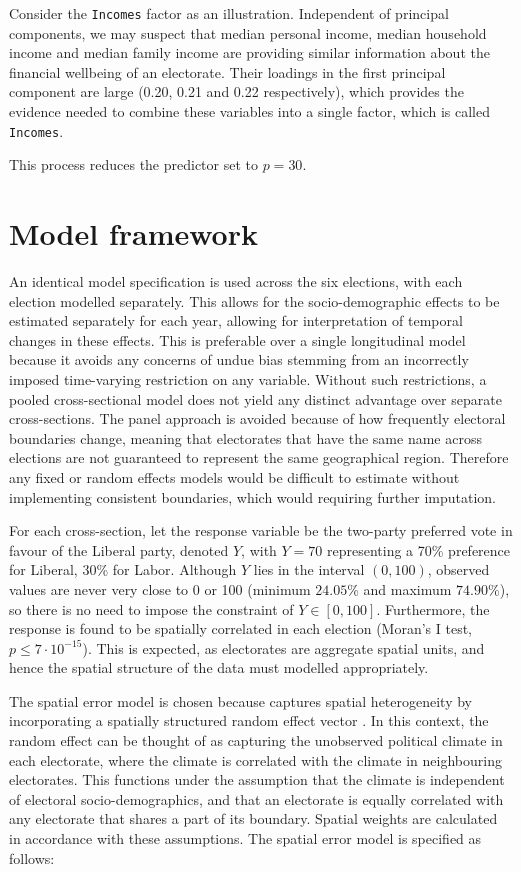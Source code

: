\documentclass[openany]{book}
\begin{document}
Consider the \texttt{Incomes} factor as an illustration. Independent of principal components, we may suspect that median personal income, median household income and median family income are providing similar information about the financial wellbeing of an electorate. Their loadings in the first principal component are large (0.20, 0.21 and 0.22 respectively), which provides the evidence needed to combine these variables into a single factor, which is called \texttt{Incomes}.

This process reduces the predictor set to \(p = 30\).

\hypertarget{model-framework}{%
\section{Model framework}\label{model-framework}}

An identical model specification is used across the six elections, with each election modelled separately. This allows for the socio-demographic effects to be estimated separately for each year, allowing for interpretation of temporal changes in these effects. This is preferable over a single longitudinal model because it avoids any concerns of undue bias stemming from an incorrectly imposed time-varying restriction on any variable. Without such restrictions, a pooled cross-sectional model does not yield any distinct advantage over separate cross-sections. The panel approach is avoided because of how frequently electoral boundaries change, meaning that electorates that have the same name across elections are not guaranteed to represent the same geographical region. Therefore any fixed or random effects models would be difficult to estimate without implementing consistent boundaries, which would requiring further imputation.

For each cross-section, let the response variable be the two-party preferred vote in favour of the Liberal party, denoted \(Y\), with \(Y = 70\) representing a 70\% preference for Liberal, 30\% for Labor. Although \(Y\) lies in the interval \((0,100)\), observed values are never very close to 0 or 100 (minimum \(24.05 \%\) and maximum \(74.90 \%\)), so there is no need to impose the constraint of \(Y \in [0,100]\). Furthermore, the response is found to be spatially correlated in each election (Moran's I test, \(p \le 7\cdot10^{-15}\)). This is expected, as electorates are aggregate spatial units, and hence the spatial structure of the data must modelled appropriately.

The spatial error model \citep{Anselin88} is chosen because captures spatial heterogeneity by incorporating a spatially structured random effect vector \citep{LeSage2009}. In this context, the random effect can be thought of as capturing the unobserved political climate in each electorate, where the climate is correlated with the climate in neighbouring electorates. This functions under the assumption that the climate is independent of electoral socio-demographics, and that an electorate is equally correlated with any electorate that shares a part of its boundary. Spatial weights are calculated in accordance with these assumptions. The spatial error model is specified as follows:
\end{document}
